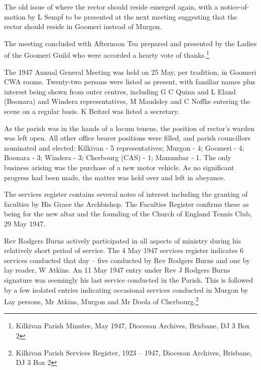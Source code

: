 The old issue of where the rector should reside emerged again, with a notice-of-motion by L Sempf to be presented at the next meeting suggesting that the rector should reside in Goomeri instead of Murgon.



The meeting concluded with Afternoon Tea prepared and presented by the Ladies of the Goomeri Guild who were accorded a hearty vote of thanks.\footnote{Kilkivan Parish Minutes, May 1947, Diocesan Archives, Brisbane, DJ 3 Box 2}


The 1947 Annual General Meeting was held on 25 May, per tradition, in Goomeri CWA rooms. Twenty-two persons were listed as present, with familiar names plus interest being shown from outer centres, including G C Quinn and L Eland (Boonara) and Windera representatives, M Maudsley and C Noffke entering the scene on a regular basis. K Beitzel was listed a secretary.



As the parish was in the hands of a locum tenens, the position of rector's warden was left open. All other office bearer positions were filled, and parish councillors nominated and elected: Kilkivan - 5 representatives; Murgon - 4; Goomeri - 4; Boonara - 3; Windera - 3; Cherbourg (CAS) - 1; Manumbar - 1. The only business arising was the purchase of a new motor vehicle. As no significant progress had been made, the matter was held over and left in abeyance.



The services register contains several notes of interest including the granting of faculties by His Grace the Archbishop. The Faculties Register confirms these as being for the new altar and the founding of the Church of England Tennis Club, 29 May 1947.



Rev Rodgers Burns actively participated in all aspects of ministry during his relatively short period of service. The 4 May 1947 services register indicates 6 services conducted that day -- five conducted by Rev Rodgers Burns and one by lay reader, W Atkins. An 11 May 1947 entry under Rev J Rodgers Burns signature was seemingly his last service conducted in the Parish. This is followed by a few isolated entries indicating occasional services conducted in Murgon by Lay persons, Mr Atkins, Murgon and Mr Doola of Cherbourg.\footnote{Kilkivan Parish Services Register, 1923 -- 1947, Diocesan Archives, Brisbane, DJ 3 Box 2}


